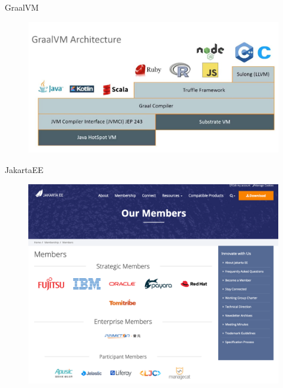 \documentclass[aspectratio=169]{beamer}
\begin{document}
\begin{frame}{GraalVM}

	\begin{figure}
		\centering
		\includegraphics[width=\linewidth]{Images/graalvm}
	\end{figure}

\end{frame}

\begin{frame}{JakartaEE}

	\begin{figure}
		\centering
		\includegraphics[width=\linewidth]{Images/jakartaee}
	\end{figure}

\end{frame}
\end{document}
